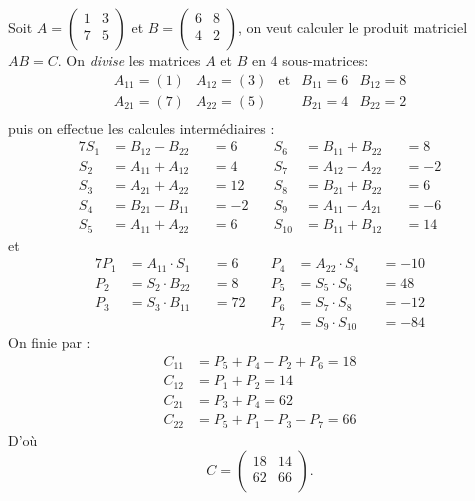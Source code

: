 \begin{description}
    \begin{ex}
      Soit $A = \begin{pmatrix}
      1 & 3\\
      7 & 5\\   
    \end{pmatrix} $ et $ B = \begin{pmatrix}
      6 & 8\\
      4 & 2\\
    \end{pmatrix}$, on veut calculer le produit matriciel $AB=C$.
    On {\it divise} les matrices $A$ et $B$ en $4$ sous-matrices: $$\begin{array}{ccccc}
      A_{11} = (1) & A_{12} = (3) & \text{et} & B_{11} = 6& B_{12} = 8\\
      A_{21} = (7) & A_{22} = (5) &&B_{21} = 4& B_{22} = 2\\
    \end{array}
    $$ puis on effectue les calcules interm\'ediaires :
    \begin{alignat*}{7}
    S_1 &= B_{12} - B_{22} &&= 6 &\quad S_6&=B_{11} + B_{22}&&= 8\\
    S_2 &= A_{11} + A_{12} &&= 4 &\quad S_7&=A_{12} - A_{22}&&=-2\\
    S_3 &= A_{21} + A_{22} &&= 12 &\quad S_8&=B_{21}+ B_{22} &&=6\\
    S_4 &= B_{21} - B_{11} &&= -2&\quad S_9&=A_{11}-A_{21}&&=-6\\
    S_5 &= A_{11} + A_{22} &&= 6 &\quad S_{10}&=B_{11}+B_{12}&&=14
    \end{alignat*} et
    \begin{alignat*}{7}
      P_1 &= A_{11}\cdot S_1 &&= 6 &\quad P_4 &= A_{22}\cdot S_4 &&=  -10\\
      P_2 &= S_2\cdot B_{22} &&= 8 &\quad P_5 &= S_5\cdot S_6 &&= 48\\
      P_3 &= S_3\cdot B_{11} &&= 72 &\quad P_6 &= S_7\cdot S_8 &&= -12\\
      &&&&\quad P_7 &= S_9\cdot S_{10} &&= -84
    \end{alignat*}
    On finie par :
    \begin{align*}
      C_{11} &=  P_5 + P_4 - P_2 + P_6 = 18\\
      C_{12} &=  P_1 + P_2 = 14\\
      C_{21} &= P_3 + P_4 = 62\\
      C_{22} &=  P_5 + P_1 - P_3 - P_7 = 66
    \end{align*}
    D'o\`u $$C = \begin{pmatrix}
      18 & 14\\
      62 & 66\\
    \end{pmatrix}.$$
    \end{ex} 


\end{description}
